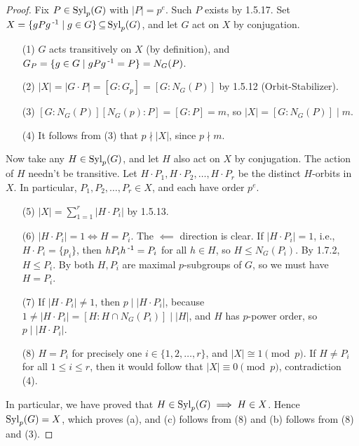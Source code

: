 \documentclass[11pt]{book}
\theoremstyle{definition}   \newtheorem{defn}[counter]{Definition} %
\numberwithin{counter}{chapter}
\begin{document}
\begin{proof}
Fix $P \in \textnormal{Syl}_p(G)$ with $|P| = p^e$. Such $P$ exists by 1.5.17. Set $X = \{gPg\operatorname{^{-1}} \mid g \in G\} \operatorname{\subseteq} \textnormal{Syl}_p(G)$, and let $G$ act on $X$ by conjugation.
\begin{enumerate}
\item[(1)] $G$ acts transitively on $X$ (by definition), and $G_P = \{g \in G \mid gPg\operatorname{^{-1}} = P\} = N_G(P)$.

\item[(2)] $|X| = |G \cdot P| = [G : G_p] = [G : N_G(P)]$ by 1.5.12 (Orbit-Stabilizer).

\item[(3)] $[G : N_G(P)][N_G(p) : P] = [G : P] = m$, so $|X| = [G : N_G(P)] \mid m$.

\item[(4)] It follows from (3) that $p \nmid |X|$, since $p \nmid m$.
\end{enumerate}

Now take any $H \in \textnormal{Syl}_p(G)$, and let $H$ also act on $X$ by conjugation. The action of $H$ needn't be transitive. Let $H\cdot P_1, H \cdot P_2, \dots, H\cdot P_r$ be the distinct $H$-orbits in $X$. In particular, $P_1,P_2,\dots,P_r \in X$, and each have order $p^e$.

\begin{enumerate}
\item[(5)] $|X| = \sum_{1=1}^r |H \cdot P_i|$ by 1.5.13.

\item[(6)] $|H \cdot P_i| = 1 \iff H = P_i$. The $\impliedby$ direction is clear. If $|H \cdot P_i| = 1$, i.e., $H \cdot P_i = \{p_i\}$, then $hP_ih\operatorname{^{-1}} = P_i$ for all $h \in H$, so $H \leq N_G(P_i)$. By 1.7.2, $H \leq P_i$. By both $H,P_i$ are maximal $p$-subgroups of $G$, so we must have $H = P_i$.

\item[(7)] If $|H \cdot P_i| \ne 1$, then $p \mid |H \cdot P_i|$, because $1 \ne |H \cdot P_i| = [H : H \cap N_G(P_i)] \mid |H|$, and $H$ has $p$-power order, so $p \mid |H \cdot P_i|$.

\item[(8)] $H = P_i$ for precisely one $i \in \{1,2,\dots,r\}$, and $|X| \cong 1 \pmod{p}$. If $H \ne P_i$ for all $1 \leq i \leq r$, then it would follow that $|X| \equiv 0 \pmod{p}$, contradiction (4).
\end{enumerate}

In particular, we have proved that $H \in \textnormal{Syl}_p(G) \implies H \in X$. Hence $\textnormal{Syl}_p(G) = X$, which proves (a), and (c) follows from (8) and (b) follows from (8) and (3).
\end{proof}
\end{document}
